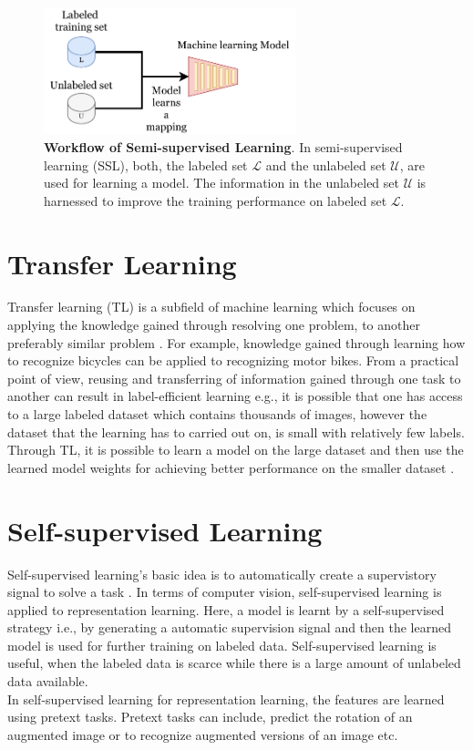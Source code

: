 \begin{figure}[htbp]
\centering
\captionsetup{format=plain}
\includegraphics[width=0.65\textwidth]{figures/fig_semi_supervised_learning.pdf}
\caption[Workflow of semi-supervised Learning]{\textbf{Workflow of Semi-supervised Learning}. In semi-supervised learning (SSL), both, the labeled set $\mathcal{L}$ and the unlabeled set $\mathcal{U}$, are used for learning a model. The information in the unlabeled set $\mathcal{U}$ is harnessed to improve the training performance on labeled set $\mathcal{L}$.}
\label{fig:semi_supervised_learning}
\end{figure}

\section{Transfer Learning}
Transfer learning (TL) is a subfield of machine learning which focuses on applying the knowledge gained through resolving one problem, to another preferably similar problem \cite{west2007}. For example, knowledge gained through learning how to recognize bicycles can be applied to recognizing motor bikes. From a practical point of view, reusing and transferring of information gained through one task to another can result in label-efficient learning e.g., it is possible that one has access to a large labeled dataset which contains thousands of images, however the dataset that the learning has to carried out on, is small with relatively few labels. Through TL, it is possible to learn a model on the large dataset and then use the learned model weights for achieving better performance on the smaller dataset \cite{pan2009}. 

\section{Self-supervised Learning}
Self-supervised learning's basic idea is to automatically create a supervistory signal to solve a task \cite{nava2019}. In terms of computer vision, self-supervised learning is applied to representation learning. Here, a model is learnt by a self-supervised strategy i.e., by generating a automatic supervision signal and then the learned model is used for further training on labeled data. Self-supervised learning is useful, when the labeled data is scarce while there is a large amount of unlabeled data available.  \\
In self-supervised learning for representation learning, the features are learned using pretext tasks. Pretext tasks can include, predict the rotation of an augmented image \cite{gidaris2018} or to recognize augmented versions of an image \cite{chen2020} etc.

